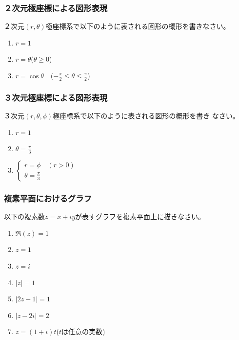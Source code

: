 \documentclass[twocolumn,11pt]{jarticle}
\begin{document}
\subsubsection{２次元極座標による図形表現}
\question
２次元$(r,\theta)$極座標系で以下のように表される図形の概形を書きなさい。
  \begin{enumerate}
  \item $r=1$
  \item $r=\theta$\quad ($\theta\ge 0$)
  \item $\displaystyle r=\cos\theta\quad (-\frac{\pi}{2}\le\theta\le\frac{\pi}{2}$)
  \end{enumerate}

\subsubsection{３次元極座標による図形表現}
\question
３次元$(r,\theta,\phi)$極座標系で以下のように表される図形の概形を書き
なさい。
\begin{enumerate}
\item $r=1$
\item $\theta=\displaystyle\frac{\pi}{3}$
\item
  $\begin{cases}
    r=\phi\quad(r>0)\\
    \theta=\displaystyle\frac{\pi}{3}
  \end{cases}
  $
\end{enumerate}


\subsubsection{複素平面におけるグラフ}
以下の複素数$z=x+iy$が表すグラフを複素平面上に描きなさい。
\begin{enumerate}
\item $\Re(z)=1$
\item $z=1$
\item $z=i$
\item $|z|=1$
\item $|2z-1|=1$
\item $|z-2i|=2$
\item $z=(1+i)t$\quad ($t$は任意の実数)
\end{enumerate}
\end{document}
